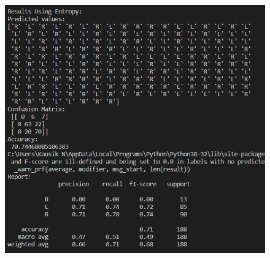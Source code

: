 \documentclass[12pt]{article}
\renewcommand{\_}{\kern-1.5pt\textunderscore\kern-1.5pt}
\begin{document}
\begin{figure}[H]
	\begin{Center}
		\includegraphics[width=6.5in,height=6.21in]{./media/image15.png}
	\end{Center}
\end{figure}



\par


\vspace{\baselineskip}

\vspace{\baselineskip}

\vspace{\baselineskip}

\vspace{\baselineskip}

\vspace{\baselineskip}

\vspace{\baselineskip}

\vspace{\baselineskip}
\end{document}
